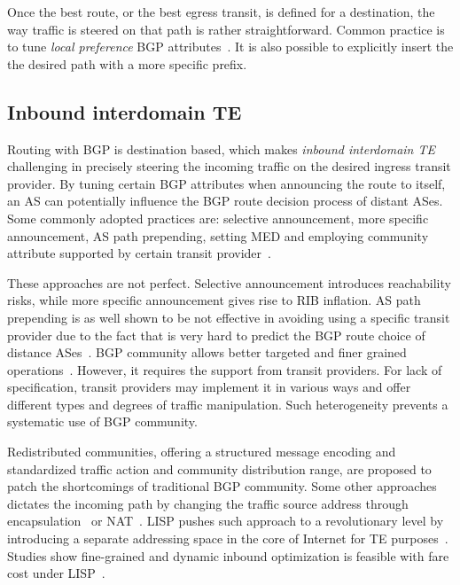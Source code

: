 Once the best route, or the best egress transit, is defined for a destination, the way traffic is steered on that path is rather straightforward. Common practice is to tune \textit{local preference} BGP attributes~\cite{Wang2008}. It is also possible to explicitly insert the the desired path with a more specific prefix.

\subsection{Inbound interdomain TE}
Routing with BGP is destination based, which makes \textit{inbound interdomain TE} challenging in precisely steering the incoming traffic on the desired ingress transit provider. By tuning certain BGP attributes when announcing the route to itself, an AS can potentially influence the BGP route decision process of distant ASes. Some commonly adopted practices are: selective announcement, more specific announcement, AS path prepending, setting \acf{MED} and employing community attribute supported by certain transit provider~\cite{Wang2008}.

These approaches are not perfect. Selective announcement introduces reachability risks, while more specific announcement gives rise to \acf{RIB} inflation. AS path prepending is as well shown to be not effective in avoiding using a specific transit provider due to the fact that is very hard to predict the BGP route choice of distance ASes~\cite{Quoitin2004a}. BGP community allows better targeted and finer grained operations~\cite{Donnet2008, Shao2015}. However, it requires the support from transit providers. For lack of specification, transit providers may implement it in various ways and offer different types and degrees of traffic manipulation. Such heterogeneity prevents a systematic use of BGP community. 

Redistributed communities, offering a structured message encoding and standardized traffic action and community distribution range, are proposed to patch the shortcomings of traditional BGP community. Some other approaches dictates the incoming path by changing the traffic source address through encapsulation~\cite{Liu2008} or \acf{NAT}~\cite{Sun2015}. \acf{LISP} pushes such approach to a revolutionary level by introducing a separate addressing space in the core of Internet for TE purposes~\cite{lisp}. Studies show fine-grained and dynamic inbound optimization is feasible with fare cost under \ac{LISP}~\cite{Iannone2007, saucez2011mechanisms, quoitin2007evaluating}.

